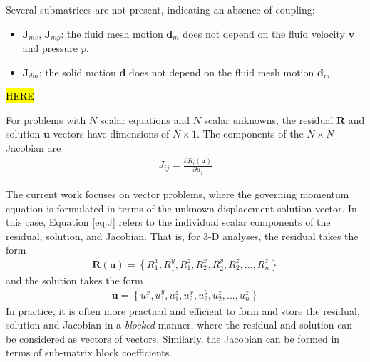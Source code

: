 \documentclass[sn-mathphys,Numbered]{sn-jnl}%
\newcommand{\bb}{\boldsymbol}
\begin{document}
Several submatrices are not present, indicating an absence of coupling:
\begin{itemize}
	\item $\bb{J}_{mv}$, $\bb{J}_{mp}$: the fluid mesh motion $\bb{d}_m$ does not depend on the fluid velocity $\bb{v}$ and pressure $p$.
	\item $\bb{J}_{dm}$: the solid motion $\bb{d}$ does not depend on the fluid mesh motion $\bb{d}_m$. 
\end{itemize}


\hl{HERE}

For problems with $N$ scalar equations and $N$ scalar unknowns, the residual $\bb{R}$ and solution $\bb{u}$ vectors have dimensions of $N \times 1$. %
The components of the $N \times N$ Jacobian are
\begin{eqnarray} \label{eq:J}
	{J}_{ij} = \frac{\partial {R}_i (\bb{u})}{\partial u_j}
\end{eqnarray}

The current work focuses on vector problems, where the governing momentum equation is formulated in terms of the unknown displacement solution vector.
In this case, Equation \ref{eq:J} refers to the individual scalar components of the residual, solution, and Jacobian.
That is, for 3-D analyses, the residual takes the form
\begin{eqnarray}
	\bb{R}(\bb{u}) = \left\{ R_1^x, R_1^y, R_1^z, R_2^x, R_2^y, R_2^z, ..., R_n^z \right\}
\end{eqnarray}
and the solution takes the form
\begin{eqnarray}
	\bb{u} = \left\{ u_1^x, u_1^y, u_1^z, u_2^x, u_2^y, u_2^z, ..., u_n^z \right\}
\end{eqnarray}
In practice, it is often more practical and efficient to form and store the residual, solution and Jacobian in a \emph{blocked} manner, where the residual and solution can be considered as vectors of vectors.
Similarly, the Jacobian can be formed in terms of sub-matrix block coefficients.
\end{document}
